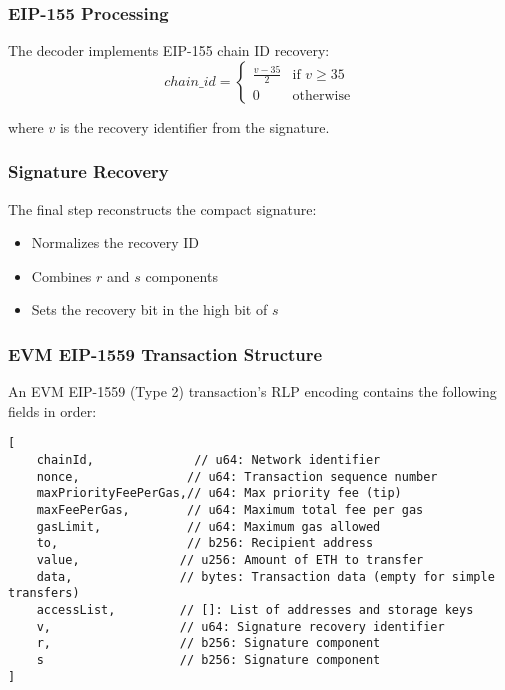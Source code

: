 \subsubsection{EIP-155 Processing}
The decoder implements EIP-155 chain ID recovery:
\[ chain\_id = \begin{cases}
    \frac{v - 35}{2} & \text{if } v \geq 35 \\
    0 & \text{otherwise}
\end{cases} \]

where $v$ is the recovery identifier from the signature.

\subsubsection{Signature Recovery}
The final step reconstructs the compact signature:
\begin{itemize}
    \item Normalizes the recovery ID
    \item Combines $r$ and $s$ components
    \item Sets the recovery bit in the high bit of $s$
\end{itemize}



\subsubsection{EVM EIP-1559 Transaction Structure}
An EVM EIP-1559 (Type 2) transaction's RLP encoding contains the following fields in order:
\begin{lstlisting}
[
    chainId,              // u64: Network identifier
    nonce,               // u64: Transaction sequence number
    maxPriorityFeePerGas,// u64: Max priority fee (tip)
    maxFeePerGas,        // u64: Maximum total fee per gas
    gasLimit,            // u64: Maximum gas allowed
    to,                  // b256: Recipient address
    value,              // u256: Amount of ETH to transfer
    data,               // bytes: Transaction data (empty for simple transfers)
    accessList,         // []: List of addresses and storage keys
    v,                  // u64: Signature recovery identifier
    r,                  // b256: Signature component
    s                   // b256: Signature component
]
\end{lstlisting}



